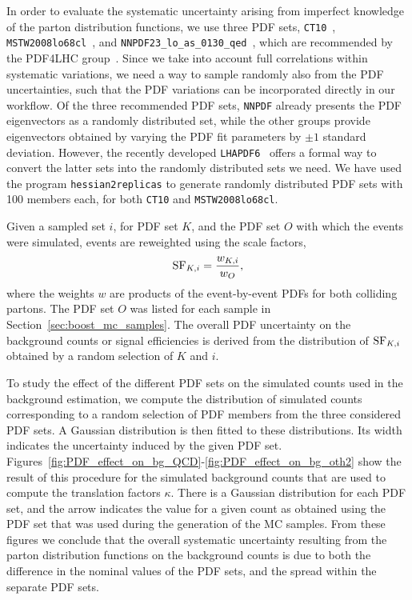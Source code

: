 In order to evaluate the systematic uncertainty arising from imperfect knowledge of the parton
distribution functions, we use three PDF sets, {\tt CT10}~\cite{Lai:2010vv}, {\tt
MSTW2008lo68cl}~\cite{Martin:2009iq},
 and {\tt NNPDF23\_lo\_as\_0130\_qed}~\cite{nnpdf}, which are
recommended by the PDF4LHC group~\cite{Alekhin:2011sk,Botje:2011sn}.  
Since we take into account full correlations within systematic variations, we need a way to sample
randomly also from the PDF uncertainties, such that the PDF variations can be incorporated directly
in our workflow. 
Of the three recommended PDF sets, {\tt NNPDF} already presents the PDF eigenvectors as a randomly
distributed set, while the other groups provide eigenvectors obtained by varying the PDF fit
parameters by $\pm 1$ standard deviation.  
However, the recently developed {\tt LHAPDF6}~\cite{LHAPDF6} offers a formal way to convert the
latter sets into the randomly distributed sets we need.  
We have used the program {\tt hessian2replicas} to generate randomly
distributed PDF sets with 100 members each, for both {\tt CT10} and {\tt MSTW2008lo68cl}.  

Given a sampled set $i$, for PDF set $K$, and the PDF set $O$ with which the events were simulated,
events are reweighted using the scale factors, 
\begin{equation}
{\rm SF}_{K, i} = \frac{w_{K, i}}{w_{O}},
\end{equation}
where the weights $w$ are products of the event-by-event PDFs for both colliding partons.
The PDF set $O$ was listed for each sample in Section~\ref{sec:boost_mc_samples}.
The overall PDF uncertainty on the background counts or signal efficiencies is derived
from the distribution of ${\rm SF}_{K, i}$ obtained by a random selection of $K$ and $i$.  

To study the effect of the different PDF sets on the simulated counts used in the background
estimation, we compute the distribution of simulated counts corresponding to a random selection of
PDF members from the three considered PDF sets. 
A Gaussian distribution is then fitted to these distributions. Its width indicates the uncertainty
induced by the given PDF set. 
Figures~\ref{fig:PDF_effect_on_bg_QCD}-\ref{fig:PDF_effect_on_bg_oth2} show the result of this
procedure for the simulated background counts that are used to compute the translation factors
$\kappa$. 
There is a Gaussian distribution for each PDF set, and the arrow indicates the value for a given
count as obtained using the PDF set that was used during the generation of the MC samples. 
From these figures we conclude that the overall systematic uncertainty resulting from the parton
distribution functions on the background counts is due to both the difference in the nominal values
of the PDF sets, and the spread within the separate PDF sets.

